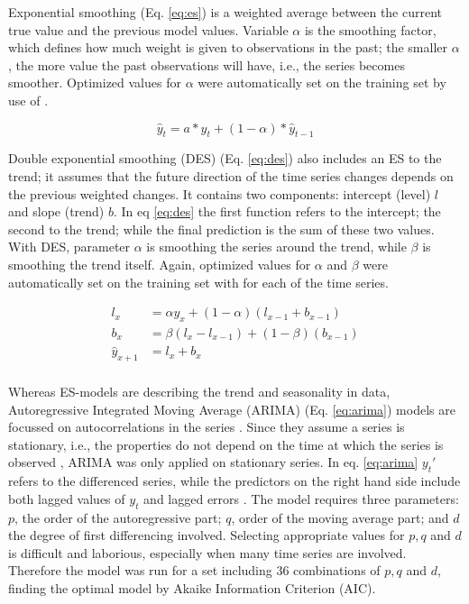 \documentclass[format=sigconf, review=false, screen=true]{acmart}
\begin{document}
Exponential smoothing (Eq. \ref{eq:es}) is a weighted average between the current true value and the previous model values. Variable $\alpha$ is the smoothing factor, which defines how much weight is given to observations in the past; the smaller $\alpha$, the more value the past observations will have, i.e., the series becomes smoother. Optimized values for $\alpha$ were automatically set on the training set by use of \citet{seabold2010statsmodels}. 

\begin{equation}
\label{eq:es}
\hat{y}_t = a * y_t + (1 - \alpha) * \hat{y}_{t-1} 
\end{equation}

Double exponential smoothing (DES) (Eq. \ref{eq:des}) also includes an ES to the trend; it assumes that the future direction of the time series changes depends on the previous weighted changes. It contains two components: intercept (level) $l$ and slope (trend) $b$. In eq \ref{eq:des} the first function refers to the intercept; the second to the trend; while the final prediction is the sum of these two values. With DES, parameter $\alpha$ is smoothing the series around the trend, while $\beta$ is smoothing the trend itself. Again, optimized values for $\alpha$ and $\beta$ were automatically set on the training set with \citet{seabold2010statsmodels} for each of the time series. 

\begin{equation}
\label{eq:des}
\begin{split}
	l_x &= \alpha y_x + (1-\alpha)(l_{x-1} + b_{x-1}) \\ 
	b_x &= \beta(l_{x} - l_{x-1}) + (1-\beta)(b_{x-1}) \\ 
	\hat{y}_{x+1} &= l_x + b_x \\
\end{split}
\end{equation}

Whereas ES-models are describing the trend and seasonality in data, Autoregressive Integrated Moving Average (ARIMA) (Eq. \ref{eq:arima}) models are focussed on autocorrelations in the series \citep{Hyndman2018forecasting}. Since they assume a series is stationary, i.e., the properties do not depend on the time at which the series is observed \citep{Hyndman2018forecasting}, ARIMA was only applied on stationary series. In eq. \ref{eq:arima} $y_t'$ refers to the differenced series, while the predictors on the right hand side include both lagged values of $y_t$ and lagged errors \citep{Hyndman2018forecasting}. The model requires three parameters: $p$, the order of the autoregressive part; $q$, order of the moving average part; and $d$ the degree of first differencing involved. Selecting appropriate values for $p, q$ and $d$ is difficult and laborious, especially when many time series are involved. Therefore the model \citep{seabold2010statsmodels} was run for a set including 36 combinations of $p, q$ and $d$, finding the optimal model by Akaike Information Criterion (AIC). 
\end{document}
